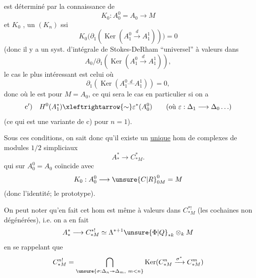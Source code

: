 
est déterminé par la connaissance de
\[
K_0:A_0^0=A_0\longrightarrow M
\]
et $K_0$ , un $(K_n)$  ssi
\[
K_0\bigl(\partial_1(\operatorname{Ker}(A_1^0\xrightarrow{d}A_1^1))\bigr)=0
\]
(donc il y a un syst. d'intégrale de Stokes-DeRham ``universel'' à valeurs dans
\[
A_0/\partial_1(\operatorname{Ker}(A_1^0\xrightarrow{d}A_1^1)),
\]
le cas le plus intéressant est celui où
\[
\partial_1(\operatorname{Ker}(A_1^0\overset{d}{\text{---}}A_1^1))=0,
\]
donc où le  est pour $M=A_0$, ce qui sera le cas en particulier si on a
\[
\mathrm{c}')\quad H^0(A_1^*)\xleftrightarrow{\sim}\varepsilon^*(A_0^0)
\qquad(\text{où }\varepsilon:\Delta_1\longrightarrow\Delta_0\ldots)
\]
(ce qui est une variante de c) pour $n=1$).


Sous ces conditions, on sait donc qu'il existe un \uline{unique} hom de complexes de modules $1/2$ simpliciaux
\[
A_*^*\longrightarrow C_{*M}^*.
\]
qui sur $A_0^0=A_0$ coïncide avec
\[
K_0:A_0^0\longrightarrow \unsure{C|R}_{0M}^0=M
\]
(donc l'identité; le  prototype).

On peut noter qu'en fait cet hom est même à valeurs dans $C_{*M}^{*!}$ (les cochaines non dégénérées), i.e. on a en fait
\[
A_*^*\longrightarrow C_{*M}^{*!}\simeq
\Lambda^{*+1}\unsure{\Phi|Q}_{*k}\otimes_k M
\]
en se rappelant que
\[
C_{*M}^{n!}=
\bigcap_{\unsure{\sigma:\Delta_n\twoheadrightarrow\Delta_m,\ m<n}}
\operatorname{Ker}(C_{*M}^{n}\xrightarrow{\sigma^*}C_{*M}^{m})
\]
